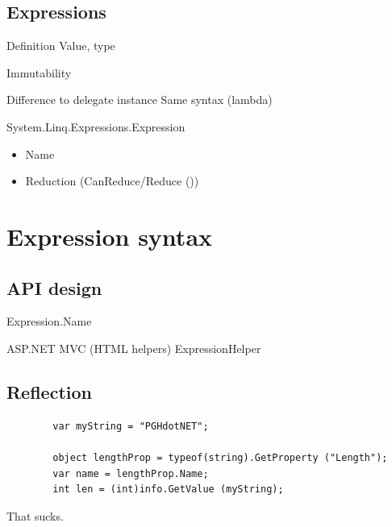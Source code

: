 \documentclass{beamer}
\begin{document}
\subsection{Expressions}
	\begin{frame}
		Definition
		Value, type
	\end{frame}
	\begin{frame}
		Immutability
	\end{frame}
	\begin{frame}
		Difference to delegate instance
		Same syntax (lambda)
	\end{frame}
	\begin{frame}
		System.Linq.Expressions.Expression
		\begin{itemize}
			\item Name
			\item Reduction (CanReduce/Reduce ())
		\end{itemize}
	\end{frame}

\section{Expression syntax}
\subsection{API design}
	\begin{frame}
		Expression.Name
	\end{frame}
	\begin{frame}
		ASP.NET MVC (HTML helpers)
		ExpressionHelper
	\end{frame}

\subsection{Reflection}
	\begin{frame}[fragile]
		\begin{verbatim}
		var myString = "PGHdotNET";

		object lengthProp = typeof(string).GetProperty ("Length");
		var name = lengthProp.Name;
		int len = (int)info.GetValue (myString);
		\end{verbatim}
	\end{frame}

	\begin{frame}
		\Huge That sucks.
	\end{frame}
\end{document}
